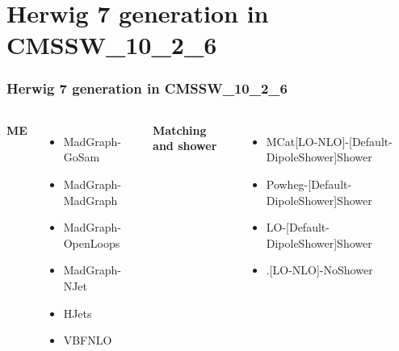 \documentclass{beamer}
\numberwithin{figure}{section}
\begin{document}

\section{Herwig 7 generation in CMSSW\_10\_2\_6}
\begin{frame}
 \frametitle{Herwig 7 generation in CMSSW\_10\_2\_6}
\vspace{25px}

 \begin{columns}[c] %

    
    \large{\textbf{ME}}
    \footnotesize
    \begin{itemize}
        \item MadGraph-GoSam
        \item MadGraph-MadGraph
        \item MadGraph-OpenLoops
        \item MadGraph-NJet
        \item HJets
        \item VBFNLO
    \end{itemize}

    \large{\textbf{Matching and shower}}
    \footnotesize
    \begin{itemize}
        \item MCat[LO-NLO]-[Default-DipoleShower]Shower    
        \item Powheg-[Default-DipoleShower]Shower
        \item LO-[Default-DipoleShower]Shower
        \item .[LO-NLO]-NoShower

    \end{itemize}
 \end{columns}

\end{frame}

\end{document}
